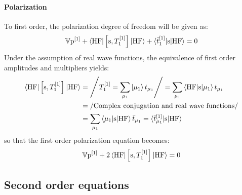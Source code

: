 \paragraph*{Polarization}
To first order, the polarization degree of freedom will be given as:
\begin{equation}%
  \V\p^{[1]} + \braket{\mathrm{HF} | \commutator{\s}{T_1^{[1]}}| \mathrm{HF}}
  + \braket{\tbar{1}^{[1]} | \s | \mathrm{HF} } = 0
\end{equation}
Under the assumption of real wave functions, the equivalence of
first order amplitudes and multipliers yields:
\begin{equation}
  \begin{aligned}
  \braket{\mathrm{HF} | \left[ \mathrm{s}, T_1^{[1]} \right]^{}| \mathrm{HF}}
  &= \left/ T_1^{[1]} = \sum_{\mu_1}\ket{\mu_1}t_{\mu_1} \right/
  =
  \sum_{\mu_1}\braket{\mathrm{HF}|\mathrm{s}|\mu_1}t_{\mu_1} \\
  &= \left/ \text{Complex conjugation and real wave functions} \right/ \\
  &= \sum_{\mu_1}\braket{\mu_1 | \mathrm{s} | \mathrm{HF}}\bar{t}_{\mu_1}
  = \braket{\bar{t}_{\mu_1}^{[1]} | \mathrm{s} | \mathrm{HF}}
 \end{aligned}
\end{equation}
so that the first order polarization equation becomes:
\begin{equation}\label{eq:1st-order-pol}
  \mathbb{V}\mathrm{p}^{[1]} + 2\braket{\mathrm{HF} | \left[ \mathrm{s}, T_1^{[1]} \right]^{}| \mathrm{HF}} = 0
\end{equation}

\subsection{Second order equations}\label{sec:second-order-pt}

